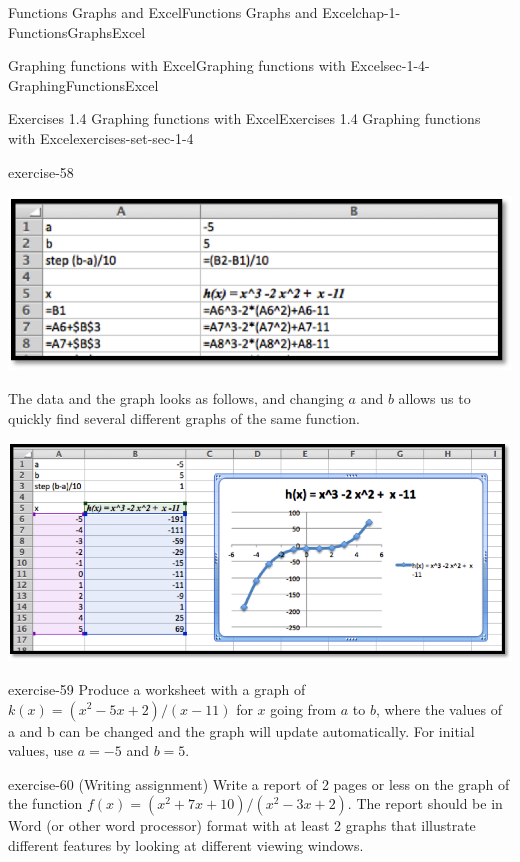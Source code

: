\documentclass[oneside,10pt,]{book}
\numberwithin{equation}{section}
\begin{document}
\begin{chapterptx}{Functions Graphs and Excel}{}{Functions Graphs and Excel}{}{}{chap-1-FunctionsGraphsExcel}
\begin{sectionptx}{Graphing functions with Excel}{}{Graphing functions with Excel}{}{}{sec-1-4-GraphingFunctionsExcel}
\begin{exercises-subsection-numberless}{Exercises 1.4 Graphing functions with Excel}{}{Exercises 1.4 Graphing functions with Excel}{}{}{exercises-set-sec-1-4}
\begin{divisionexercise}{5}{}{}{exercise-58}
\begin{sidebyside}{1}{0}{0}{0}
\begin{sbspanel}{1}
\includegraphics[width=1\linewidth]{images/sec1-4-sol5a.png}
\end{sbspanel}%
\end{sidebyside}%
\par
\hypertarget{p-350}{}%
The data and the graph looks as follows, and changing \(a\) and \(b\) allows us to quickly find several different graphs of the same function.%
\begin{sidebyside}{1}{0}{0}{0}%
\begin{sbspanel}{1}%
\includegraphics[width=1\linewidth]{images/sec1-4-sol5b.png}
\end{sbspanel}%
\end{sidebyside}%
\end{divisionexercise}%
\begin{divisionexercise}{6}{}{}{exercise-59}%
\hypertarget{p-351}{}%
Produce a worksheet with a graph of \(k(x) = (x^2 -5 x + 2)/( x -11)\) for \(x\) going from \(a\) to \(b\), where the values of a and b can be changed and the graph will update automatically.  For initial values, use \(a = -5\) and \(b = 5\).%
\end{divisionexercise}%
\begin{divisionexercise}{7}{}{}{exercise-60}%
\hypertarget{p-352}{}%
(Writing assignment) Write a report of 2 pages or less on the graph of the function \(f(x) = (x^2 + 7 x + 10)/(x^2 - 3 x +2)\).  The report should be in Word (or other word processor) format with at least 2 graphs that illustrate different features by looking at different viewing windows.%

\end{divisionexercise}
\end{exercises-subsection-numberless}
\end{sectionptx}
\end{chapterptx}
\end{document}
